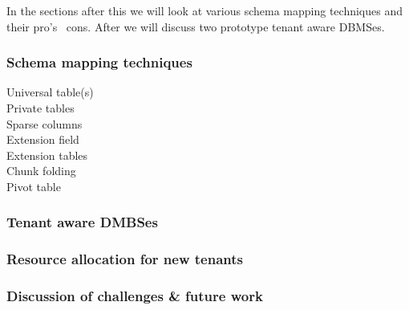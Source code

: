 In the sections after this we will look at various schema mapping techniques and their pro's \ cons.
After we will discuss two prototype tenant aware DBMSes.

\subsubsection{Schema mapping techniques}
\begin{description}
	\item[Universal table(s)]
	\item[Private tables]
	\item[Sparse columns]
	\item[Extension field]
	\item[Extension tables]
	\item[Chunk folding] %
	\item[Pivot table]
\end{description}

\subsubsection{Tenant aware DMBSes}

\subsubsection{Resource allocation for new tenants}

\subsubsection{Discussion of challenges \& future work}
